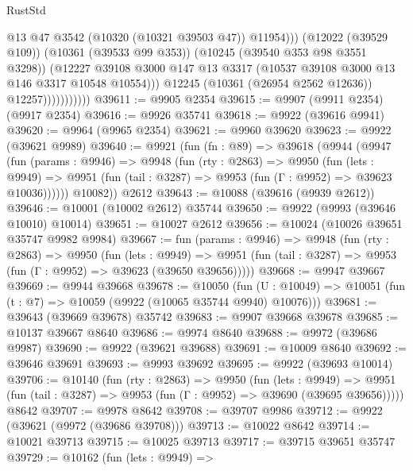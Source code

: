 \begin{lexlean}{RustStd}
\begin{coremodule}
                                  @13
                                  @47
                                  @3542
                                  (@10320 (@10321 @39503 @47))
                                  @11954)))
                            (@12022 (@39529 @109))
                            (@10361 (@39533 @99 @353))
                            (@10245 (@39540 @353 @98 @3551 @3298))
                            (@12227
                              @39108
                              @3000
                              @147
                              @13
                              @3317
                              (@10537 @39108 @3000 @13 @146 @3317 @10548 @10554)))
                          @12245
                          (@10361 (@26954 @2562 @12636))
                          @12257)))))))))))
@39611 := @9905 @2354
@39615 := @9907 (@9911 @2354) (@9917 @2354)
@39616 := @9926 @35741
@39618 := @9922 (@39616 @9941)
@39620 := @9964 (@9965 @2354)
@39621 := @9960 @39620
@39623 := @9922 (@39621 @9989)
@39640 := @9921
    (fun (fn : @89) =>
    @39618
      (@9944
        (@9947
          (fun (params : @9946) =>
          @9948
            (fun (rty : @2863) =>
            @9950
              (fun (lets : @9949) =>
              @9951 (fun (tail : @3287) => @9953 (fun (Γ : @9952) => @39623 @10036))))))
        @10082))
    @2612
@39643 := @10088 (@39616 (@9939 @2612))
@39646 := @10001 (@10002 @2612) @35744
@39650 := @9922 (@9993 (@39646 @10010) @10014)
@39651 := @10027 @2612
@39656 := @10024 (@10026 @39651 @35747 @9982 @9984)
@39667 := fun (params : @9946) =>
  @9948
    (fun (rty : @2863) =>
    @9950
      (fun (lets : @9949) =>
      @9951 (fun (tail : @3287) => @9953 (fun (Γ : @9952) => @39623 (@39650 @39656)))))
@39668 := @9947 @39667
@39669 := @9944 @39668
@39678 := @10050
    (fun (U : @10049) => @10051 (fun (t : @7) => @10059 (@9922 (@10065 @35744 @9940) @10076)))
@39681 := @39643 (@39669 @39678) @35742
@39683 := @9907 @39668 @39678
@39685 := @10137 @39667 @8640
@39686 := @9974 @8640
@39688 := @9972 (@39686 @9987)
@39690 := @9922 (@39621 @39688)
@39691 := @10009 @8640
@39692 := @39646 @39691
@39693 := @9993 @39692
@39695 := @9922 (@39693 @10014)
@39706 := @10140
    (fun (rty : @2863) =>
    @9950
      (fun (lets : @9949) =>
      @9951 (fun (tail : @3287) => @9953 (fun (Γ : @9952) => @39690 (@39695 @39656)))))
    @8642
@39707 := @9978 @8642
@39708 := @39707 @9986
@39712 := @9922 (@39621 (@9972 (@39686 @39708)))
@39713 := @10022 @8642
@39714 := @10021 @39713
@39715 := @10025 @39713
@39717 := @39715 @39651 @35747
@39729 := @10162
    (fun (lets : @9949) =>

\end{coremodule}
\end{lexlean}

